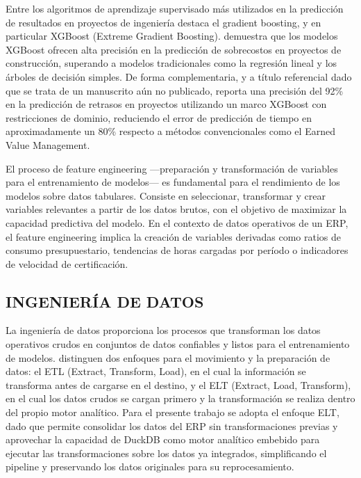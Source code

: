 \documentclass{univalle-perfil}
\begin{document}
Entre los algoritmos de aprendizaje supervisado más utilizados en la predicción de resultados en proyectos de ingeniería destaca el gradient boosting, y en particular XGBoost (Extreme Gradient Boosting). \textcite{XGBoostCostOverrun2026} demuestra que los modelos XGBoost ofrecen alta precisión en la predicción de sobrecostos en proyectos de construcción, superando a modelos tradicionales como la regresión lineal y los árboles de decisión simples. De forma complementaria, y a título referencial dado que se trata de un manuscrito aún no publicado, \textcite{DomainAwareXGBoost2025} reporta una precisión del 92\% en la predicción de retrasos en proyectos utilizando un marco XGBoost con restricciones de dominio, reduciendo el error de predicción de tiempo en aproximadamente un 80\% respecto a métodos convencionales como el Earned Value Management.

El proceso de feature engineering —preparación y transformación de variables para el entrenamiento de modelos— es fundamental para el rendimiento de los modelos sobre datos tabulares. Consiste en seleccionar, transformar y crear variables relevantes a partir de los datos brutos, con el objetivo de maximizar la capacidad predictiva del modelo. En el contexto de datos operativos de un ERP, el feature engineering implica la creación de variables derivadas como ratios de consumo presupuestario, tendencias de horas cargadas por período o indicadores de velocidad de certificación.

\subsection{INGENIERÍA DE DATOS}

La ingeniería de datos proporciona los procesos que transforman los datos operativos crudos en conjuntos de datos confiables y listos para el entrenamiento de modelos. \textcite{ReisHousley2022} distinguen dos enfoques para el movimiento y la preparación de datos: el ETL (Extract, Transform, Load), en el cual la información se transforma antes de cargarse en el destino, y el ELT (Extract, Load, Transform), en el cual los datos crudos se cargan primero y la transformación se realiza dentro del propio motor analítico. Para el presente trabajo se adopta el enfoque ELT, dado que permite consolidar los datos del ERP sin transformaciones previas y aprovechar la capacidad de DuckDB como motor analítico embebido para ejecutar las transformaciones sobre los datos ya integrados, simplificando el pipeline y preservando los datos originales para su reprocesamiento.
\end{document}
